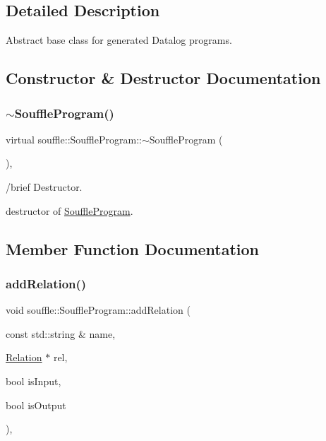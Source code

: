 \subsection{Detailed Description}
Abstract base class for generated Datalog programs. 

\subsection{Constructor \& Destructor Documentation}
\mbox{\label{classsouffle_1_1_souffle_program_ae2f4223a3f80c0239e404ef8da23d669}} 
\subsubsection{\texorpdfstring{$\sim$\+Souffle\+Program()}{~SouffleProgram()}}
{\footnotesize\ttfamily virtual souffle\+::\+Souffle\+Program\+::$\sim$\+Souffle\+Program (\begin{DoxyParamCaption}{ }\end{DoxyParamCaption})\hspace{0.3cm}{\ttfamily [virtual]}, {\ttfamily [default]}}

/brief Destructor.

destructor of \hyperlink{classsouffle_1_1_souffle_program}{Souffle\+Program}. 

\subsection{Member Function Documentation}
\mbox{\label{classsouffle_1_1_souffle_program_a76d04bb16509820a91b24867c608bc10}} 
\subsubsection{\texorpdfstring{add\+Relation()}{addRelation()}}
{\footnotesize\ttfamily void souffle\+::\+Souffle\+Program\+::add\+Relation (\begin{DoxyParamCaption}\item[{const std\+::string \&}]{name,  }\item[{\hyperlink{classsouffle_1_1_relation}{Relation} $\ast$}]{rel,  }\item[{bool}]{is\+Input,  }\item[{bool}]{is\+Output }\end{DoxyParamCaption})\hspace{0.3cm}{\ttfamily [inline]}, {\ttfamily [protected]}}


